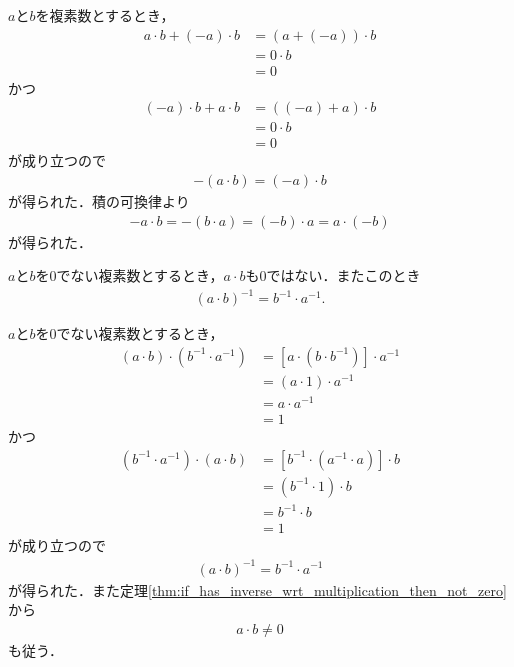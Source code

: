 	\begin{sketch}
		$a$と$b$を複素数とするとき，
		\begin{align}
			a \cdot b + (-a) \cdot b
			&= (a + (-a)) \cdot b \\
			&= 0 \cdot b \\
			&= 0
		\end{align}
		かつ
		\begin{align}
			(-a) \cdot b + a \cdot b
			&= ((-a) + a) \cdot b \\
			&= 0 \cdot b \\
			&= 0
		\end{align}
		が成り立つので
		\begin{align}
			-(a \cdot b) = (-a) \cdot b
		\end{align}
		が得られた．積の可換律より
		\begin{align}
			-a \cdot b = -(b \cdot a) = (-b) \cdot a = a \cdot (-b)
		\end{align}
		が得られた．
		\QED
	\end{sketch}
	
	\begin{screen}
		\begin{thm}[$0$でない数同士の積は乗法に関して逆元を持つ]
		\label{thm:C_has_no_zero_divisor}
			$a$と$b$を$0$でない複素数とするとき，$a \cdot b$も$0$ではない．またこのとき
			\begin{align}
				(a \cdot b)^{-1} = b^{-1} \cdot a^{-1}.
			\end{align}
		\end{thm}
	\end{screen}
	
	\begin{sketch}
		$a$と$b$を$0$でない複素数とするとき，
		\begin{align}
			(a \cdot b) \cdot (b^{-1} \cdot a^{-1})
			&= \left[a \cdot (b \cdot b^{-1})\right] \cdot a^{-1} \\
			&= (a \cdot 1) \cdot a^{-1} \\
			&= a \cdot a^{-1} \\
			&= 1
		\end{align}
		かつ
		\begin{align}
			(b^{-1} \cdot a^{-1}) \cdot (a \cdot b) 
			&= \left[b^{-1} \cdot (a^{-1} \cdot a)\right] \cdot b \\
			&= (b^{-1} \cdot 1) \cdot b \\
			&= b^{-1} \cdot b \\
			&= 1
		\end{align}
		が成り立つので
		\begin{align}
			(a \cdot b)^{-1} = b^{-1} \cdot a^{-1}
		\end{align}
		が得られた．また定理\ref{thm:if_has_inverse_wrt_multiplication_then_not_zero}から
		\begin{align}
			a \cdot b \neq 0
		\end{align}
		も従う．
		\QED
	\end{sketch}
	
